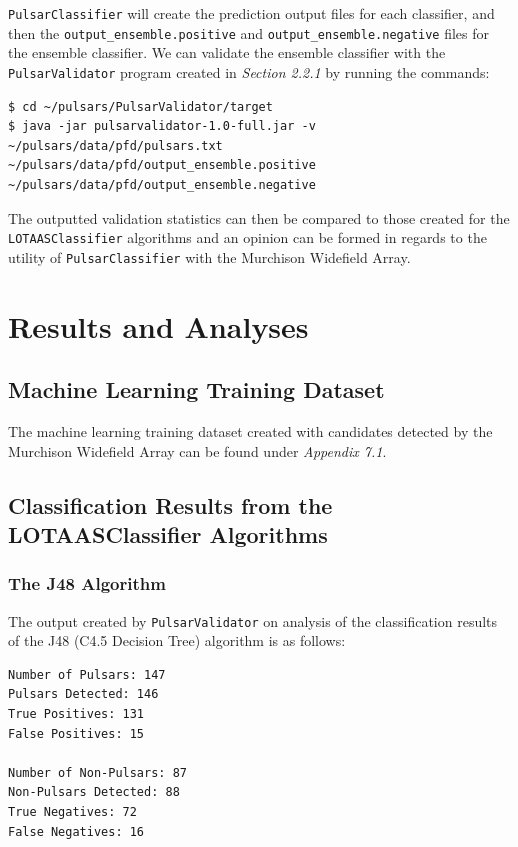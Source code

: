 \documentclass{article}
\begin{document}
\verb|PulsarClassifier| will create the prediction output files for each classifier, and then the \verb|output_ensemble.positive| and \verb|output_ensemble.negative| files for the ensemble classifier. We can validate the ensemble classifier with the \verb|PulsarValidator| program created in \emph{Section 2.2.1} by running the commands:

\begin{lstlisting}[numbers=none]
$ cd ~/pulsars/PulsarValidator/target
$ java -jar pulsarvalidator-1.0-full.jar -v ~/pulsars/data/pfd/pulsars.txt ~/pulsars/data/pfd/output_ensemble.positive ~/pulsars/data/pfd/output_ensemble.negative
\end{lstlisting}

The outputted validation statistics can then be compared to those created for the \verb|LOTAASClassifier| algorithms and an opinion can be formed in regards to the utility of \verb|PulsarClassifier| with the Murchison Widefield Array.

\pagebreak
\section{Results and Analyses}
\subsection{Machine Learning Training Dataset}

The machine learning training dataset created with candidates detected by the Murchison Widefield Array can be found under \emph{Appendix 7.1}.

\subsection{Classification Results from the LOTAASClassifier Algorithms}

\subsubsection{The J48 Algorithm}

The output created by \verb|PulsarValidator| on analysis of the classification results of the J48 (C4.5 Decision Tree) algorithm is as follows:

\begin{lstlisting}[numbers=none]
Number of Pulsars: 147
Pulsars Detected: 146
True Positives: 131
False Positives: 15

Number of Non-Pulsars: 87
Non-Pulsars Detected: 88
True Negatives: 72
False Negatives: 16
\end{lstlisting}
\end{document}
